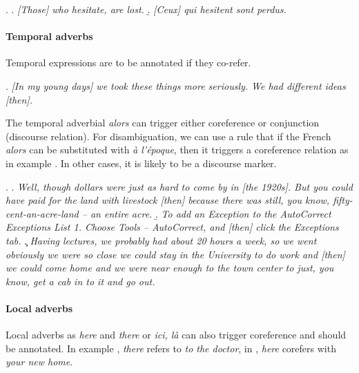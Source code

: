 \documentclass[a4paper]{article}
\begin{document}
\ex.
\a. {\sl [Those] who hesitate, are lost.}
\b. \textsl{[Ceux] qui hesitent sont perdus.}


\paragraph*{Temporal adverbs}

Temporal expressions are to be annotated if they co-refer.

\ex.
\textsl{[In my young days] we took these things more seriously. We had different ideas [then].}

The temporal adverbial \textsl{alors} can trigger either coreference or
conjunction (discourse relation). For disambiguation, we can use a rule that if
the French {\sl alors} can be substituted with {\sl à l'époque}, then it
triggers a coreference relation as in example \Next[a]. In  other cases, it is
likely to be a discourse marker. 

\ex.
\a. {\sl Well, though dollars were just as hard to come by in [the 1920s]. But you could have paid for the land with livestock [then] because there was still, you know, fifty-cent-an-acre-land -- an entire acre.}
\b. {\sl To add an Exception to the AutoCorrect Exceptions List 1. Choose Tools -- AutoCorrect, and [then] click the Exceptions tab.}
\c. {\sl 
Having lectures, we probably had about 20 hours a week, so we went obviously we were so close we could stay in the University to do work and [then] we could come home and we were near enough to the town center to just, you know, get a cab in to it and go out.}

\paragraph*{Local adverbs}
Local adverbs as {\sl here} and {\sl there} or {\sl ici, là} can also trigger
coreference and should be annotated. In example \Next[a], {\sl there} refers to
{\sl to the doctor}, in \Next[b], {\sl here} corefers with {\sl your new home}.
\end{document}
